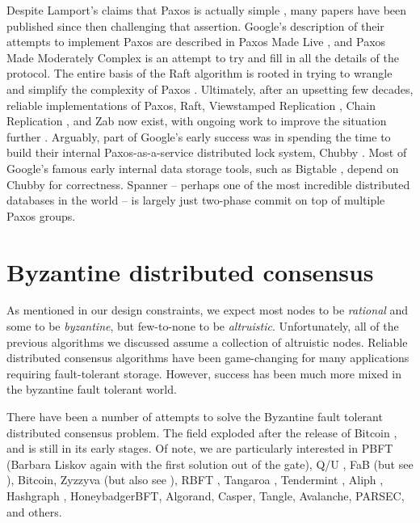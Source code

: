 \documentclass[8pt,fleqn,openany]{book}
\begin{document}
Despite Lamport's claims that Paxos is actually simple \cite{paxos-simple},
many papers have been published since then
challenging that assertion. Google's description of their attempts to implement
Paxos are described in Paxos Made Live \cite{paxos-live},
and Paxos Made Moderately
Complex \cite{paxos-complex} is an attempt to try and fill in all the details of
the protocol. The entire basis of the Raft algorithm is rooted in trying to
wrangle and simplify the complexity of Paxos \cite{raft}. Ultimately, after an
upsetting few decades, reliable implementations of Paxos, Raft, Viewstamped
Replication \cite{vrr}, Chain Replication \cite{chain-rep}, and Zab \cite{zab}
now exist, with ongoing work to improve the situation
further \cite{epaxos,paxos-flexible}. Arguably, part of Google's early success
was in spending the time to build their internal Paxos-as-a-service distributed
lock system, Chubby \cite{chubby}. Most of Google's famous early internal data
storage tools, such as Bigtable \cite{bigtable}, depend on Chubby for
correctness. Spanner \cite{spanner} -- perhaps one of the most incredible
distributed databases in the world -- is largely just two-phase commit on top of
multiple Paxos groups.

\section{Byzantine distributed consensus}

As mentioned in our design constraints, we expect most nodes to be {\em
rational} and some to be {\em byzantine}, but few-to-none to be {\em
altruistic}. Unfortunately, all of the previous algorithms we discussed assume a
collection of altruistic nodes.
Reliable distributed consensus algorithms have been game-changing for many
applications requiring fault-tolerant storage. However, success has been much
more mixed in the byzantine fault tolerant world.

There have been a number of attempts to solve the Byzantine fault tolerant
distributed consensus problem. The field exploded after the release of Bitcoin
\cite{bitcoin}, and is still in its early stages. Of note, we are particularly
interested in PBFT \cite{pbft} (Barbara Liskov again with the
first solution out of the gate), Q/U \cite{qu}, FaB \cite{fab} (but see
\cite{fab-revisited}), Bitcoin, Zyzzyva \cite{zyzzyva} (but also
see \cite{fab-revisited}), RBFT \cite{rbft}, Tangaroa \cite{tangaroa},
Tendermint \cite{tendermint}, Aliph \cite{aliph}, Hashgraph \cite{hashgraph},
HoneybadgerBFT\cite{honeybadger}, Algorand\cite{algorand}, Casper\cite{casper},
Tangle\cite{tangle}, Avalanche\cite{avalanche}, PARSEC\cite{parsec}, and
others\cite{mickens-bft}.
\end{document}
